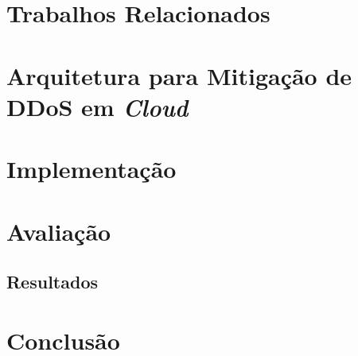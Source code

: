 \documentclass[a4paper, 12pt]{article}
\begin{document}
\section{Trabalhos Relacionados}


\section{Arquitetura para Mitigação de DDoS em \emph{Cloud}}



\section{Implementação}


\section{Avaliação}




\subsection{Resultados}


\section{Conclusão}



%

%


% 

{\footnotesize

}
\end{document}

